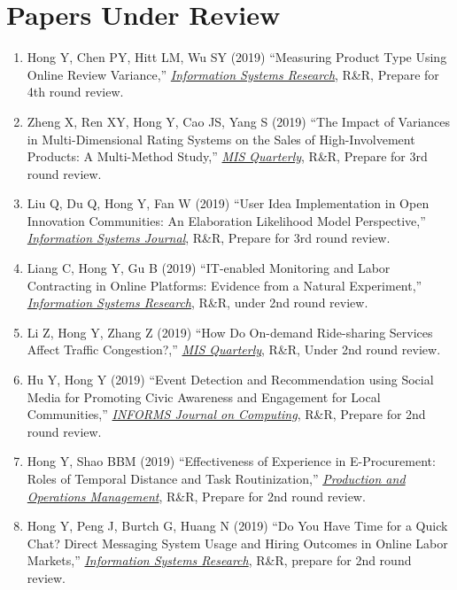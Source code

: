 \documentclass[paper=letter,fontsize=10pt]{scrartcl} %
\newcommand{\NewPart}[2]{\section*{{#1} #2}}
\newcommand{\ReviewEntry}[5]{
		\noindent #1 (#2) ``#3,'' \textit{\ul{#4}}, #5.}
\newcommand{\Hong}{Hong Y}
\begin{document}
\NewPart{Papers Under Review}{}
\begin{enumerate}

\item \ReviewEntry{\Hong, Chen PY, Hitt LM, Wu SY}{2019}{Measuring Product Type Using Online Review Variance}{\protect\newline Information Systems Research}{R\&R, Prepare for 4th round review}{}

\item \ReviewEntry{Zheng X, Ren XY, \Hong, Cao JS, Yang S}{2019}{The Impact of Variances in Multi-Dimensional Rating Systems on the Sales of High-Involvement Products: A Multi-Method Study}{\protect\newline MIS Quarterly}{R\&R, Prepare for 3rd round review}{}

\item \ReviewEntry{Liu Q, Du Q, \Hong, Fan W}{2019}{User Idea Implementation in Open Innovation Communities: An Elaboration Likelihood Model Perspective}{\protect\newline Information Systems Journal}{R\&R, Prepare for 3rd round review}{}

\item \ReviewEntry{Liang C, \Hong, Gu B}{2019}{IT-enabled Monitoring and Labor Contracting in Online Platforms: Evidence from a Natural Experiment}{\protect\newline Information Systems Research}{R\&R, under 2nd round review}{}

\item \ReviewEntry{Li Z, \Hong, Zhang Z}{2019}{How Do On-demand Ride-sharing Services Affect Traffic Congestion?}{\protect\newline MIS Quarterly}{R\&R, Under 2nd round review}{}

\item \ReviewEntry{Hu Y, \Hong}{2019}{Event Detection and Recommendation using Social Media for Promoting Civic Awareness and Engagement for Local Communities}{\protect\newline INFORMS Journal on Computing}{R\&R, Prepare for 2nd round review}{}

\item \ReviewEntry{\Hong, Shao BBM}{2019}{Effectiveness of Experience in E-Procurement: Roles of Temporal Distance and Task Routinization}{\protect\newline Production and Operations Management}{R\&R, Prepare for 2nd round review}{}

\item \ReviewEntry{\Hong, Peng J, Burtch G, Huang N}{2019}{Do You Have Time for a Quick Chat? Direct Messaging System Usage and Hiring Outcomes in Online Labor Markets}{\protect\newline Information Systems Research}{R\&R, prepare for 2nd round review}{}


\end{enumerate}
\end{document}
